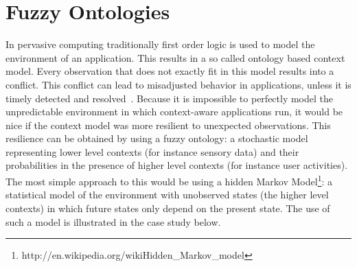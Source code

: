 \documentclass[journal]{vgtc}                %
\begin{document}
\section{Fuzzy Ontologies}
In pervasive computing traditionally first order logic is used to model the environment of an application. This results in a so called ontology based context model. Every observation that does not exactly fit in this model results into a conflict. This conflict can lead to misadjusted behavior in applications, unless it is timely detected and resolved~\cite{xu:2010:PCC}. Because it is impossible to perfectly model the unpredictable environment in which context-aware applications run, it would be nice if the context model was more resilient to unexpected observations. This resilience can be obtained by using a fuzzy ontology: a stochastic model representing lower level contexts (for instance sensory data) and their probabilities in the presence of higher level contexts (for instance user activities). The most simple approach to this would be using a hidden Markov Model\footnote{http://en.wikipedia.org/wikiHidden\_Markov\_model}: a statistical model of the environment with unobserved states (the higher level contexts) in which future states only depend on the present state. The use of such a model is illustrated in the case study below.
\end{document}
